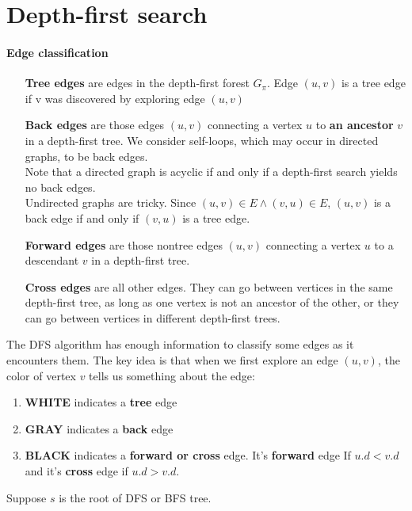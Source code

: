 \documentclass{book}
\begin{document}
	\section{Depth-first search}
	\label{psec:EdgeClassification}
	\paragraph{Edge classification}
	\begin{itemize}
	\item[\textbf{Tree edges}] are edges in the depth-first forest $G_\pi$. Edge $(u, v)$ is a tree edge if v was discovered by exploring edge $(u, v)$
	\item[\textbf{Back edges}] are those edges $(u, v)$ connecting a vertex $u$ to \textbf{an ancestor} $v$ in a depth-first tree. We consider self-loops, which may occur in directed graphs, to be back edges.\\
	Note that a directed graph is acyclic if and only if a depth-first search yields no back edges.\\
	
	Undirected graphs are tricky. Since $(u, v) \in E \land (v, u) \in E$, $(u, v)$ is a back edge if and only if $(v, u)$ is a tree edge.
	\item[\textbf{Forward edges}] are those nontree edges $(u, v)$ connecting a vertex $u$ to a descendant $v$ in a depth-first tree.
	\item[\textbf{Cross edges}] are all other edges. They can go between vertices in the same depth-first tree, as long as one vertex is not an ancestor of the other, or they can go between vertices in different depth-first trees.
	\end{itemize}
	The DFS algorithm has enough information to classify some edges as it encounters them. The key idea is that when we first explore an edge $(u, v)$, the color of vertex $v$ tells us something about the edge:
	\begin{enumerate}
	\item \textbf{WHITE} indicates a \textbf{tree} edge
	\item \textbf{GRAY} indicates a \textbf{back} edge
	\item \textbf{BLACK} indicates a \textbf{forward or cross} edge. It's \textbf{forward} edge If $u.d < v.d$ and it's \textbf{cross} edge if $u.d > v.d$.
	\end{enumerate}
	Suppose $s$ is the root of DFS or BFS tree.
\end{document}
